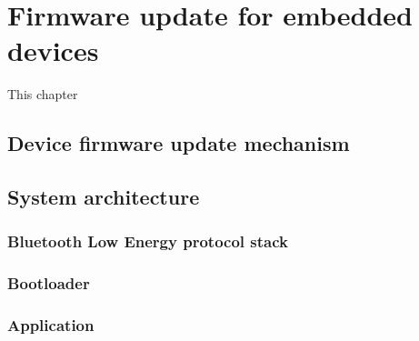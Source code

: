 \section{Firmware update for embedded devices}
\justify
This chapter 

\subsection{Device firmware update mechanism}

\subsection{System architecture}
\subsubsection{Bluetooth Low Energy protocol stack}
\subsubsection{Bootloader}
\subsubsection{Application}